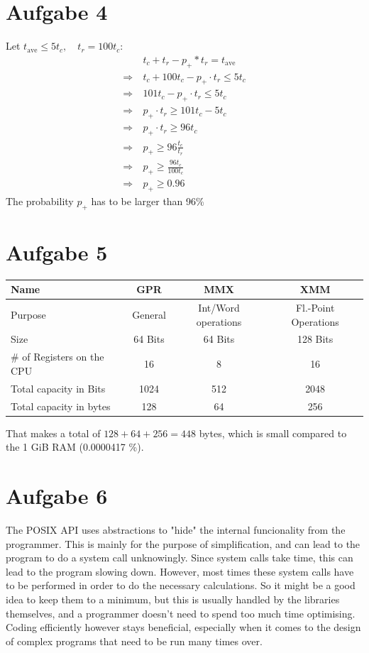 \documentclass{article}
\begin{document}
\section*{Aufgabe 4} 
Let \( t _{\text{ave}} \leq 5 t_c, \quad t_r = 100 t_c\):
\begin{align*}
    &t_c+t_r - p _{+} * t_r = t _{\text{ave}} \\
    \Rightarrow \ &t_c + 100 t_c - p_+ \cdot t_r \leq 5 t_c \\
    \Rightarrow \ &101 t_c - p_+ \cdot t_r \leq 5 t_c \\
    \Rightarrow \ &p_+ \cdot t_r \geq 101 t_c - 5 t_c \\
    \Rightarrow \ &p_+ \cdot t_r \geq 96 t_c \\
    \Rightarrow \ &p_+ \geq 96 \frac{t_c}{t_r} \\
    \Rightarrow \ &p_+ \geq \frac{96 t_c}{100 t_c} \\
    \Rightarrow \ &p_+ \geq 0.96
\end{align*}
The probability \( p_+ \) has to be larger than 96\%

\section*{Aufgabe 5} 
\begin{table}[H]
    \centering
\begin{tabular}{lccc}
    \toprule
    Name & GPR & MMX & XMM \\ \midrule
    Purpose & General & Int/Word operations & Fl.-Point Operations \\
    Size & 64 Bits & 64 Bits & 128 Bits \\
    \# of Registers on the CPU & 16 & 8 & 16 \\ \midrule
    Total capacity in Bits & 1024 & 512 & 2048 \\
    Total capacity in bytes & 128 & 64 & 256 \\
    \bottomrule
\end{tabular}
\end{table}
That makes a total of \( 128+64+256 = 448 \) bytes, which is small compared
to the 1 GiB RAM (0.0000417 \%).

\section*{Aufgabe 6}
The POSIX API uses abstractions to "hide" the internal funcionality from the
programmer. This is mainly for the purpose of simplification, and can lead to
the program to do a system call unknowingly. Since system calls take time, this
can lead to the program slowing down. However, most times these system calls
have to be performed in order to do the necessary calculations. So it might
be a good idea to keep them to a minimum, but this is usually handled by the
libraries themselves, and a programmer doesn't need to spend too much time
optimising. Coding efficiently however stays beneficial, especially when it
comes to the design of complex programs that need to be run many times
over.
\end{document}

